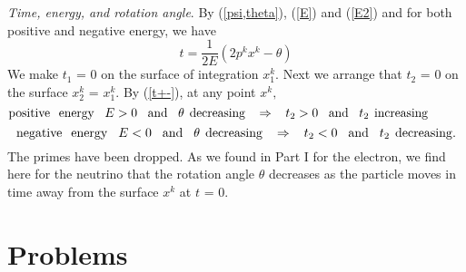 \documentclass[a4paper,12pt]{article}
\begin{document}
	{\textit{Time, energy, and rotation angle}}. By (\ref{psi,theta}), (\ref{E}) and (\ref{E2}) and for both positive and negative energy, we have
\begin{equation}	\label{t+-}
t = \frac{1}{2E} (2p^{k}x^{k} - \theta) 
\end{equation}
We make $t_{1}$ = 0 on the surface of integration $x_{1}^{k}.$ Next we arrange that $t_{2}$ = 0 on the surface $x_{2}^{k}$ = $x_{1}^{k}.$ By (\ref{t+-}), at any point $x^{k},$
$$
{\mathrm{positive}} \hspace{0.25 cm} {\mathrm{energy}} \hspace{0.3 cm} E > 0 \hspace{0.3 cm} {\mathrm{and}} \hspace{0.3 cm} \theta \hspace{0.15 cm} {\mathrm{decreasing}} \hspace{0.3cm} \Rightarrow \hspace{0.3cm}  t_{2} > 0  \hspace{0.3 cm}	{\mathrm{and}} \hspace{0.3 cm} t_{2} \hspace{0.15 cm} {\mathrm{increasing}} \hspace{1cm}
$$
\begin{equation}	\label{t+-a}
{\mathrm{negative}} \hspace{0.25 cm} {\mathrm{energy}} \hspace{0.3 cm} E < 0 \hspace{0.3 cm} {\mathrm{and}} \hspace{0.3 cm} \theta \hspace{0.15 cm} {\mathrm{decreasing}} \hspace{0.3cm} \Rightarrow \hspace{0.3cm}  t_{2} < 0  \hspace{0.3 cm}	{\mathrm{and}} \hspace{0.3 cm} t_{2} \hspace{0.15 cm} {\mathrm{decreasing}} .
\end{equation}
The primes have been dropped. As we found in Part I for the electron, we find here for the neutrino that the rotation angle $\theta$ decreases as the particle moves in time away from the surface $x^{k}$ at $t$ = 0. 

\pagebreak
	
\appendix



 \section{Problems} %
\end{document}
